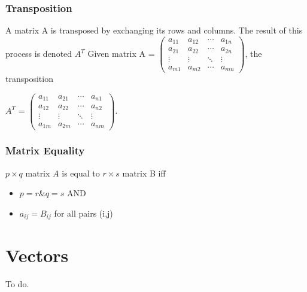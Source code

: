 \documentclass[12pt,letterpaper,final]{article}
\begin{document}
\subsubsection{Transposition}
A matrix A is transposed by exchanging its rows and columns. The result of this process is denoted $A^T$
Given matrix A = 
$
 \begin{pmatrix}
  a_{11} & a_{12} & \cdots & a_{1n} \\
  a_{21} & a_{22} & \cdots & a_{2n} \\
  \vdots  & \vdots  & \ddots & \vdots  \\
  a_{m1} & a_{m2} & \cdots & a_{mn}
 \end{pmatrix}
$, the transposition 

$A^T$ =
$
 \begin{pmatrix}
  a_{11} & a_{21} & \cdots & a_{n1} \\
  a_{12} & a_{22} & \cdots & a_{n2} \\
  \vdots  & \vdots  & \ddots & \vdots  \\
  a_{1m} & a_{2m} & \cdots & a_{nm}
 \end{pmatrix}
$.
\subsubsection{Matrix Equality}
$p \times q$ matrix $A$ is equal to $r \times s$ matrix B iff 
\begin{itemize}
\item $p = r \& q = s$ AND
\item $a_{ij} = B_{ij}$ for all pairs (i,j)
\end{itemize}

\section{Vectors}
To do. 
\end{document}
